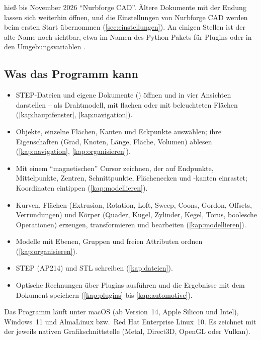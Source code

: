 \begin{hinweis}
\produkt{} hieß bis November 2026 \enquote{Nurbforge CAD}. Ältere Dokumente mit der Endung
 lassen sich weiterhin öffnen, und die Einstellungen von Nurbforge CAD werden
beim ersten Start übernommen (\autoref{sec:einstellungen}). An einigen Stellen ist der alte
Name noch sichtbar, etwa im Namen des Python-Pakets  für Plugins oder in den
Umgebungsvariablen .
\end{hinweis}

\subsection*{Was das Programm kann}

\begin{itemize}
  \item STEP-Dateien und eigene Dokumente () öffnen und in vier Ansichten
    darstellen -- als Drahtmodell, mit flachen oder mit beleuchteten Flächen
    (\autoref{kap:hauptfenster}, \autoref{kap:navigation}).
  \item Objekte, einzelne Flächen, Kanten und Eckpunkte auswählen; ihre Eigenschaften (Grad,
    Knoten, Länge, Fläche, Volumen) ablesen (\autoref{kap:navigation},
    \autoref{kap:organisieren}).
  \item Mit einem \enquote{magnetischen} Cursor zeichnen, der auf Endpunkte, Mittelpunkte,
    Zentren, Schnittpunkte, Flächenecken und -kanten einrastet; Koordinaten eintippen
    (\autoref{kap:modellieren}).
  \item Kurven, Flächen (Extrusion, Rotation, Loft, Sweep, Coons, Gordon, Offsets,
    Verrundungen) und Körper (Quader, Kugel, Zylinder, Kegel, Torus, boolesche Operationen)
    erzeugen, transformieren und bearbeiten (\autoref{kap:modellieren}).
  \item Modelle mit Ebenen, Gruppen und freien Attributen ordnen (\autoref{kap:organisieren}).
  \item STEP (AP214) und STL schreiben (\autoref{kap:dateien}).
  \item Optische Rechnungen über Plugins ausführen und die Ergebnisse mit dem Dokument
    speichern (\autoref{kap:plugins} bis \autoref{kap:automotive}).
\end{itemize}

Das Programm läuft unter macOS (ab Version~14, Apple Silicon und Intel), Windows~11 und
AlmaLinux bzw.\ Red Hat Enterprise Linux~10. Es zeichnet mit der jeweils nativen
Grafikschnittstelle (Metal, Direct3D, OpenGL oder Vulkan).

